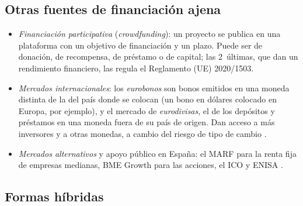 \documentclass[11pt]{article}
\begin{document}
\begin{infografia}[H]
\centering
\caption{\emph{Factoring} y \emph{confirming}}\label{figu:factoring}
\end{infografia}

\subsection{Otras fuentes de financiación ajena}\label{anexo:otras-fuentes}

\begin{itemize}
\item \emph{Financiación participativa} (\emph{crowdfunding}): un proyecto se publica en una plataforma con un objetivo de financiación y un plazo. Puede ser de donación, de recompensa, de préstamo o de capital; las 2~últimas, que dan un rendimiento financiero, las regula el Reglamento (UE) 2020/1503\nocite{CE2026Crowdfunding}.
\item \emph{Mercados internacionales}: los \emph{eurobonos} son bonos emitidos en una moneda distinta de la del país donde se colocan (un bono en dólares colocado en Europa, por ejemplo), y el mercado de \emph{eurodivisas}, el de los depósitos y préstamos en una moneda fuera de su país de origen. Dan acceso a más inversores y a otras monedas, a cambio del riesgo de tipo de cambio .
\item \emph{Mercados alternativos} y apoyo público en España: el MARF para la renta fija de empresas medianas, BME Growth para las acciones, el ICO y ENISA .
\end{itemize}

\subsection{Formas híbridas}\label{anexo:hibridos}
\end{document}
